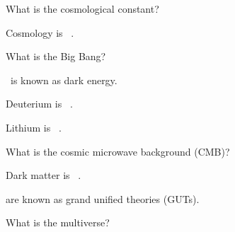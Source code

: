 \documentclass[addpoints]{exam}
\begin{document}
\begin{questions}


\question
What is the cosmological constant?

\question
Cosmology is \fillin\ .

\question
What is the Big Bang?

\question
\fillin\ is known as dark energy.

\question
Deuterium is \fillin\ .

\question
Lithium is \fillin\ .

\question
What is the cosmic microwave background (CMB)?

\question
Dark matter is \fillin\ .

\question
\fillin are known as grand unified theories (GUTs).

\question
What is the multiverse?

\end{questions}
\end{document}
